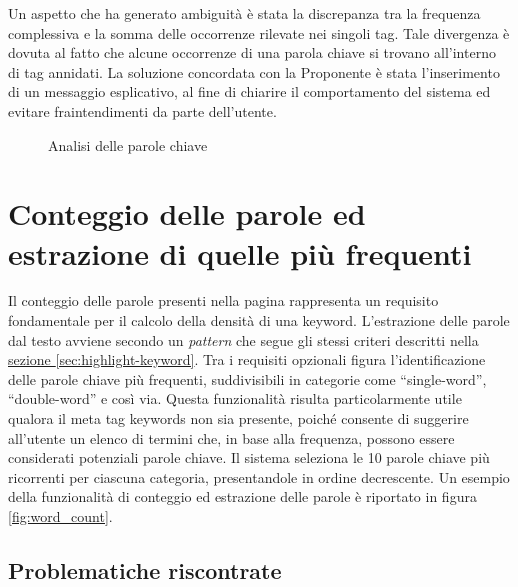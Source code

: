 \vspace{10pt}
\noindent Un aspetto che ha generato ambiguità è stata la discrepanza tra la frequenza complessiva e la somma delle occorrenze rilevate nei singoli tag. Tale divergenza è dovuta al fatto che alcune occorrenze di una parola chiave si trovano all’interno di tag annidati. La soluzione concordata con la Proponente è stata l’inserimento di un messaggio esplicativo, al fine di chiarire il comportamento del sistema ed evitare fraintendimenti da parte dell’utente.

\begin{figure}[H]
  \centering 
  \caption{Analisi delle parole chiave}
  \label{fig:analyze_keyword}
\end{figure}

\section{Conteggio delle parole ed estrazione di quelle più frequenti}
\label{sec:count-word}

Il conteggio delle parole presenti nella pagina rappresenta un requisito fondamentale per il calcolo della densità di una keyword. L'estrazione delle parole dal testo avviene secondo un \textit{pattern} che segue gli stessi criteri descritti nella \hyperref[sec:highlight-keyword]{sezione \textsection\ref*{sec:highlight-keyword}}. Tra i \gls{requisiti} opzionali figura l'identificazione delle parole chiave più frequenti, suddivisibili in categorie come “single-word”, “double-word” e così via. Questa funzionalità risulta particolarmente utile qualora il meta tag keywords non sia presente, poiché consente di suggerire all’utente un elenco di termini che, in base alla frequenza, possono essere considerati potenziali parole chiave. Il sistema seleziona le 10 parole chiave più ricorrenti per ciascuna categoria, presentandole in ordine decrescente. Un esempio della funzionalità di conteggio ed estrazione delle parole è riportato in figura \ref{fig:word_count}.

\subsection{Problematiche riscontrate}

